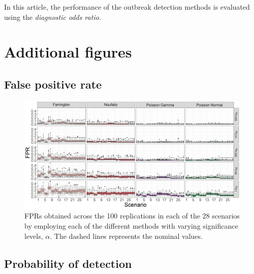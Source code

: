\documentclass[preprint, 3p, authoryear]{elsarticle} %
\begin{document}
In this article, the performance of the outbreak detection methods is evaluated using the \emph{diagnostic odds ratio}.

\newpage

\appendix

\hypertarget{additional-figures}{%
\section{Additional figures}\label{additional-figures}}

\hypertarget{false-positive-rate-1}{%
\subsection{False positive rate}\label{false-positive-rate-1}}



\begin{figure}[H]
\includegraphics[width=1\linewidth]{../../figures/FPR_alpha_methods} \caption{FPRs obtained across the 100 replications in each of the 28 scenarios by employing each of the different methods with varying significance levels, \(\alpha\). The dashed lines represents the nominal values.}\label{fig:FPRalphamethods}
\end{figure}

\hypertarget{probability-of-detection-1}{%
\subsection{Probability of detection}\label{probability-of-detection-1}}
\end{document}
